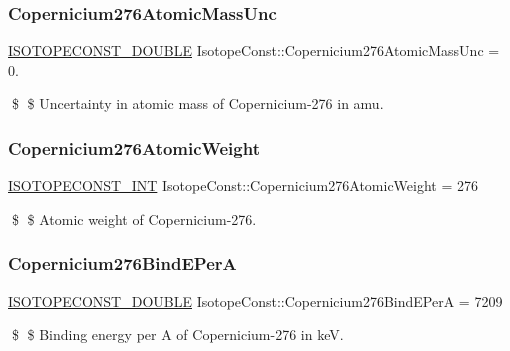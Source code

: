 \subsubsection{\texorpdfstring{Copernicium276\+Atomic\+Mass\+Unc}{Copernicium276AtomicMassUnc}}
{\footnotesize\ttfamily \mbox{\hyperlink{group___isotope_const-_macros_ga8f45a7272ce02c0b4c65c44636ed719a}{I\+S\+O\+T\+O\+P\+E\+C\+O\+N\+S\+T\+\_\+\+D\+O\+U\+B\+LE}} Isotope\+Const\+::\+Copernicium276\+Atomic\+Mass\+Unc = 0.}

\$ \$ Uncertainty in atomic mass of Copernicium-\/276 in amu. \mbox{\label{group___isotope_const-_copernicium-_cn276_gaf676889e48af736466f8b589e68af876}} 
\subsubsection{\texorpdfstring{Copernicium276\+Atomic\+Weight}{Copernicium276AtomicWeight}}
{\footnotesize\ttfamily \mbox{\hyperlink{group___isotope_const-_macros_ga5f18360b3e99483a35c32d789e62621c}{I\+S\+O\+T\+O\+P\+E\+C\+O\+N\+S\+T\+\_\+\+I\+NT}} Isotope\+Const\+::\+Copernicium276\+Atomic\+Weight = 276}

\$ \$ Atomic weight of Copernicium-\/276. \mbox{\label{group___isotope_const-_copernicium-_cn276_gac494a08f5bc907f1e72e7c3bcd3fa79c}} 
\subsubsection{\texorpdfstring{Copernicium276\+Bind\+E\+PerA}{Copernicium276BindEPerA}}
{\footnotesize\ttfamily \mbox{\hyperlink{group___isotope_const-_macros_ga8f45a7272ce02c0b4c65c44636ed719a}{I\+S\+O\+T\+O\+P\+E\+C\+O\+N\+S\+T\+\_\+\+D\+O\+U\+B\+LE}} Isotope\+Const\+::\+Copernicium276\+Bind\+E\+PerA = 7209}

\$ \$ Binding energy per A of Copernicium-\/276 in keV. \mbox{\label{group___isotope_const-_copernicium-_cn276_ga251518ee926b9477d28a3469ebcae371}} 
